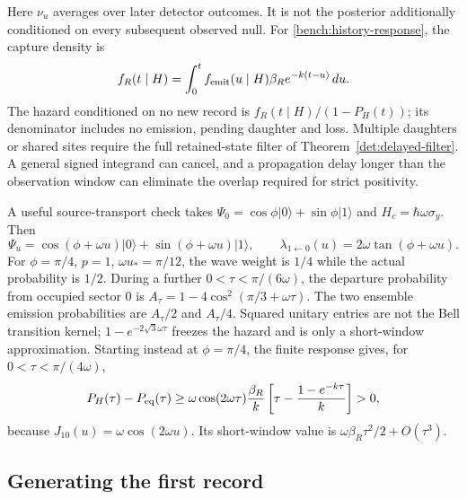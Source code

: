 \documentclass[11pt,oneside,openany]{book}
\theoremstyle{definition}
\theoremstyle{remark}\newtheorem{remark}[theorem]{Remark}
\begin{document}
Here $\nu_u$ averages over later detector outcomes. It is not the
posterior additionally conditioned on every subsequent observed null.
For \eqref{bench:history-response}, the capture density is
\[
 f_R(t\mid H)=\int_0^t f_{\rm emit}(u\mid H)
                          \beta_Re^{-k(t-u)}\,du.
\]
The hazard conditioned on no new record is $f_R(t\mid H)/(1-P_H(t))$;
its denominator includes no emission, pending daughter and loss.
Multiple daughters or shared sites require the full retained-state
filter of Theorem~\ref{det:delayed-filter}. A general signed integrand
can cancel, and a propagation delay longer than the observation
window can eliminate the overlap required for strict positivity.

A useful source-transport check takes
$\Psi_0=\cos\phi|0\rangle+\sin\phi|1\rangle$ and
$H_c=\hbar\omega\sigma_y$. Then
\[
 \Psi_u=\cos(\phi+\omega u)|0\rangle+\sin(\phi+\omega u)|1\rangle,
 \qquad\lambda_{1\leftarrow0}(u)=2\omega\tan(\phi+\omega u).
\]
For $\phi=\pi/4$, $p=1$, $\omega u_*=\pi/12$, the wave weight is
$1/4$ while the actual probability is $1/2$. During a further
$0<\tau<\pi/(6\omega)$, the departure probability from occupied
sector 0 is $A_\tau=1-4\cos^2(\pi/3+\omega\tau)$.
The two ensemble emission probabilities are $A_\tau/2$ and
$A_\tau/4$. Squared unitary entries are not the Bell transition
kernel; $1-e^{-2\sqrt3\omega\tau}$ freezes the hazard and is only a
short-window approximation. Starting instead at $\phi=\pi/4$, the
finite response gives, for $0<\tau<\pi/(4\omega)$,
\[
 P_H(\tau)-P_{\rm eq}(\tau)\ge
 \omega\cos(2\omega\tau)\frac{\beta_R}{k}
 \left[\tau-\frac{1-e^{-k\tau}}k\right]>0,
\]
because $J_{10}(u)=\omega\cos(2\omega u)$. Its short-window value is
$\omega\beta_R\tau^2/2+O(\tau^3)$.

\subsection{Generating the first record}
\end{document}
